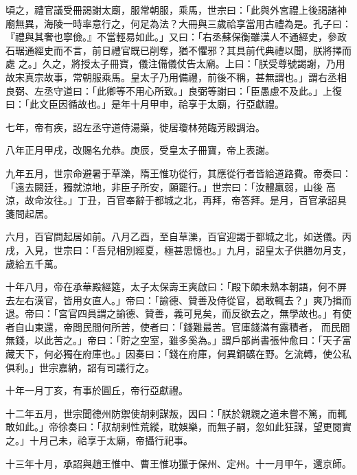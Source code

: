 \begin{pinyinscope}
 頃之，禮官議受冊謁謝太廟，服常朝服，乘馬，世宗曰：「此與外宮禮上後謁諸神廟無異，海陵一時率意行之，何足為法？大冊與三歲祫享當用古禮為是。孔子曰：『禮與其奢也寧儉。』不當輕易如此。」又曰：「右丞蘇保衡雖漢人不通經史，參政石琚通經史而不言，前日禮官既已削奪，猶不懼邪？其具前代典禮以聞，朕將擇而處
 之。」久之，將授太子冊寶，儀注備儀仗告太廟。上曰：「朕受尊號謁謝，乃用故宋真宗故事，常朝服乘馬。皇太子乃用備禮，前後不稱，甚無謂也。」謂右丞相良弼、左丞守道曰：「此卿等不用心所致。」良弼等謝曰：「臣愚慮不及此。」上復曰：「此文臣因循故也。」是年十月甲申，祫享于太廟，行亞獻禮。



 七年，帝有疾，詔左丞守道侍湯藥，徙居瓊林苑臨芳殿調治。



 八年正月甲戌，改賜名允恭。庚辰，受皇太子冊寶，帝上表謝。



 九年五月，世宗命避暑于草濼，隋王惟功從行，其應從行者皆給道路費。帝奏曰：「遠去闕廷，獨就涼地，非臣子所安，願罷行。」世宗曰：「汝體羸弱，山後
 高涼，故命汝往。」丁丑，百官奉辭于都城之北，再拜，帝答拜。是月，百官承詔具箋問起居。



 六月，百官問起居如前。八月乙酉，至自草濼，百官迎謁于都城之北，如送儀。丙戌，入見，世宗曰：「吾兒相別經夏，極甚思憶也。」九月，詔皇太子供膳勿月支，歲給五千萬。



 十年八月，帝在承華殿經筵，太子太保壽王爽啟曰：「殿下頗未熟本朝語，何不屏去左右漢官，皆用女直人。」帝曰：「諭德、贊善及侍從官，曷敢輒去？」爽乃揖而退。帝曰：「宮官四員謂之諭德、贊善，義可見矣，而反欲去之，無學故也。」有使者自山東還，帝問民間何所苦，使者曰：「錢難最苦。官庫錢滿有露積者，
 而民間無錢，以此苦之。」帝曰：「貯之空室，雖多奚為。」謂戶部尚書張仲愈曰：「天子富藏天下，何必獨在府庫也。」因奏曰：「錢在府庫，何異銅礦在野。乞流轉，使公私俱利。」世宗嘉納，詔有司議行之。



 十年一月丁亥，有事於圓丘，帝行亞獻禮。



 十二年五月，世宗聞德州防禦使胡剌謀叛，因曰：「朕於親親之道未嘗不篤，而輒敢如此。」帝徐奏曰：「叔胡剌性荒縱，耽娛樂，而無子嗣，忽如此狂謀，望更閱實之。」十月己未，祫享于太廟，帝攝行祀事。



 十三年十月，承詔與趙王惟中、曹王惟功獵于保州、定州。十一月甲午，還京師。




\end{pinyinscope}
